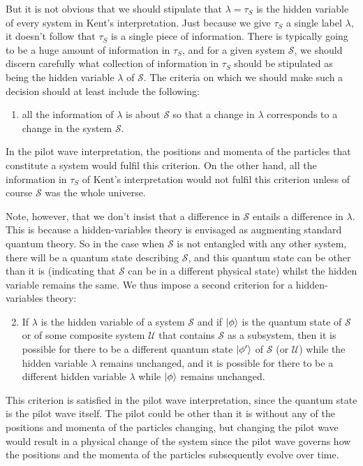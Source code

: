 But it is not obvious that we should stipulate that $\lambda=\tau_S$ is the hidden variable of every system in Kent's interpretation. Just because we give $\tau_S$ a single label $\lambda$, it doesn't follow that $\tau_S$ is a single piece of information. There is typically going to be a huge amount of information in $\tau_S$, and for a given system $\mathcal{S}$, we should  discern carefully what collection of information in $\tau_S$ should be stipulated as being the hidden variable $\lambda$ of $\mathcal{S}$. The criteria on which we should make such a decision should at least include the following:
\begin{enumerate}
	\item all the information of $\lambda$ is about $\mathcal{S}$ so that a change in $\lambda$ corresponds to a change in the system $\mathcal{S}$.\label{hidden1}
\end{enumerate} 
In the pilot wave interpretation, the positions and momenta of the particles that constitute a system would fulfil this criterion. On the other hand, all the information in $\tau_S$ of Kent's interpretation would not fulfil this criterion unless of course $\mathcal{S}$ was the whole universe. 

Note, however, that we don't insist that a difference in $\mathcal{S}$ entails a difference in $\lambda$. This is because a hidden-variables theory is envisaged as augmenting standard quantum theory. So in the case when $\mathcal{S}$ is not entangled with any other system, there will be a quantum state describing $\mathcal{S}$, and this quantum state can be other than it is (indicating that $\mathcal{S}$ can be in a different physical state)  whilst the hidden variable remains the same. We thus impose a second criterion for a hidden-variables theory:
\begin{enumerate}
	\setcounter{enumi}{1}
	\item \label{hidden3} If $\lambda$ is the hidden variable of a system $\mathcal{S}$ and if $\ket{\phi}$ is the quantum state of $\mathcal{S}$ or of some composite system $\mathcal{U}$ that contains $\mathcal{S}$ as a subsystem, then it is possible for there to be a different quantum state $\ket{\phi'}$ of $\mathcal{S}$ (or $\mathcal{U}$) while the hidden variable $\lambda$ remains unchanged, and it is possible for there to be a different hidden variable $\lambda$ while $\ket{\phi}$ remains unchanged.
\end{enumerate}
This criterion is satisfied in the pilot wave interpretation, since the quantum state is the pilot wave itself. The pilot could be other than it is without any of the positions and momenta of the particles changing, but changing the pilot wave would result in a physical change of the system since the pilot wave governs how  the positions and the momenta of the particles subsequently evolve over time.

